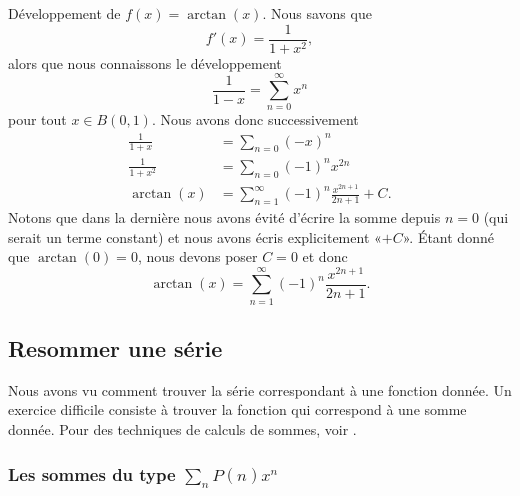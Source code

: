 \begin{example}     \label{ExwobBAW}
    Développement de \( f(x)=\arctan(x)\). Nous savons que
    \begin{equation}
        f'(x)=\frac{1}{ 1+x^2 },
    \end{equation}
    alors que nous connaissons le développement
    \begin{equation}    \label{EqVmuaqT}
        \frac{1}{ 1-x }=\sum_{n=0}^{\infty}x^n
    \end{equation}
    pour tout \( x\in B(0,1)\). Nous avons donc successivement
    \begin{subequations}
        \begin{align}
            \frac{1}{ 1+x }&=\sum_{n=0}(-x)^n\\
            \frac{ 1 }{ 1+x^2 }&=\sum_{n=0}(-1)^nx^{2n}\\
            \arctan(x)&=\sum_{n=1}^{\infty}(-1)^n\frac{ x^{2n+1} }{ 2n+1 }+C.
        \end{align}
    \end{subequations}
    Notons que dans la dernière nous avons évité d'écrire la somme depuis \( n=0\) (qui serait un terme constant) et nous avons écris explicitement «\( +C\)». Étant donné que \( \arctan(0)=0\), nous devons poser \( C=0\) et donc
    \begin{equation}
        \arctan(x)=\sum_{n=1}^{\infty}(-1)^n\frac{ x^{2n+1} }{ 2n+1 }.
    \end{equation}
\end{example}

\subsection{Resommer une série}

Nous avons vu comment trouver la série correspondant à une fonction donnée. Un exercice difficile consiste à trouver la fonction qui correspond à une somme donnée. Pour des techniques de calculs de sommes, voir \cite{DAnSerEntiere}.

\subsubsection{Les sommes du type \texorpdfstring{$ \sum_nP(n)x^n$}{P}}

